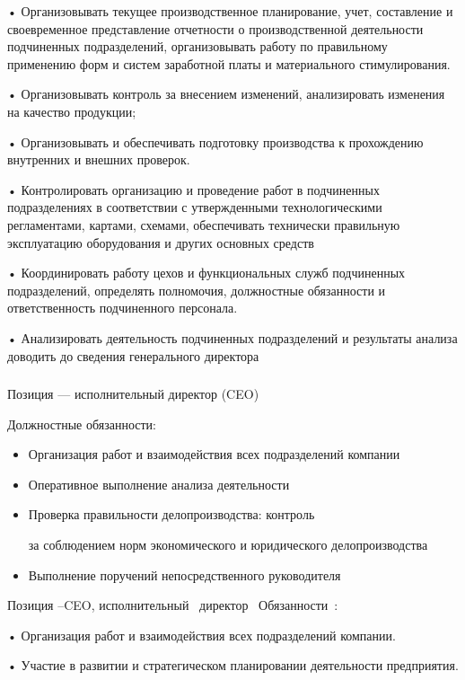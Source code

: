 \documentclass{../industrial-development}
\begin{document}
•	Организовывать текущее производственное планирование, учет, составление и своевременное представление отчетности о производственной деятельности подчиненных подразделений, организовывать работу по правильному применению форм и систем заработной платы и материального стимулирования.

•	Организовывать контроль за внесением изменений, анализировать изменения на качество продукции;

•	Организовывать и обеспечивать подготовку производства к прохождению внутренних и внешних проверок.

•	Контролировать организацию и проведение работ в подчиненных подразделениях в соответствии с утвержденными технологическими регламентами, картами, схемами, обеспечивать технически правильную эксплуатацию оборудования и других основных средств

•	Координировать работу цехов и функциональных служб подчиненных подразделений, определять полномочия, должностные обязанности и ответственность подчиненного персонала.

•	Анализировать деятельность подчиненных подразделений и результаты анализа доводить до сведения генерального директора


\begin{frame} \frametitle{}
 \begin{block}{}
  \alert{Позиция --- исполнительный директор (CEO)}

Должностные обязанности: 
  \end{block}
  \begin{itemize}
  \item Организация работ и взаимодействия всех подразделений компании
 \item Оперативное выполнение анализа деятельности
 \item Проверка правильности делопроизводства: контроль 

за соблюдением норм экономического и юридического делопроизводства
  \item Выполнение поручений непосредственного руководителя 
  \end{itemize}
\end{frame}

\lecturenotes

Позиция –CEO, исполнительный~\cite{hh} директор~\cite{itcf}
Обязанности~\cite{rab}:

•	Организация работ и взаимодействия всех подразделений компании. 

•	Участие в развитии и стратегическом планировании деятельности предприятия. 
\end{document}
